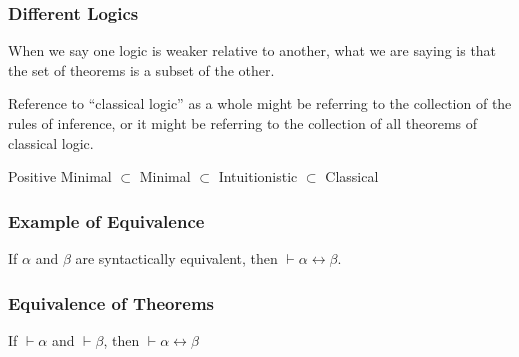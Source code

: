 \documentclass{beamer}
\begin{document}
\begin{frame}
	\frametitle{Different Logics}

	When we say one logic is weaker relative to another, what we are saying is that the set of theorems is a subset of the other. 

	\vspace{5mm}

	Reference to ``classical logic'' as a whole might be referring to the collection of the rules of inference, or it might be referring to the collection of all theorems of classical logic. 

	\vspace{5mm}

	\begin{center}
	Positive Minimal $\subset$ Minimal $\subset$ Intuitionistic $\subset$ Classical
	\end{center}

\end{frame}








\begin{frame}
	\frametitle{Example of Equivalence}	
	
	If $\alpha$ and $\beta$ are syntactically equivalent, then $\vdash \alpha \leftrightarrow \beta$. 
	
	\vspace{7cm}
	
\end{frame}

\begin{frame}
	\frametitle{Equivalence of Theorems}
	
	If $\vdash \alpha$ and $\vdash \beta$, then $\vdash \alpha \leftrightarrow \beta$
	
	\vspace{7cm}
	
\end{frame}
\end{document}
